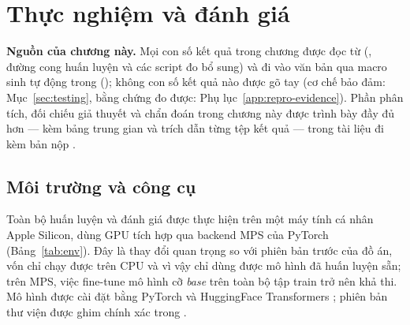 \bigskip
\section{Thực nghiệm và đánh giá}
\label{sec:experiments}

\begin{keybox}
\textbf{Nguồn của chương này.} Mọi con số kết quả trong chương được đọc từ
 (, đường cong huấn luyện và các script đo bổ sung)
và đi vào văn bản qua macro sinh tự động trong 
(); không con số kết quả nào được gõ tay (cơ chế bảo đảm:
Mục~\ref{sec:testing}, bằng chứng đo được:
Phụ lục~\ref{app:repro-evidence}). Phần phân tích, đối chiếu giả thuyết và chẩn đoán trong chương
này được trình bày đầy đủ hơn --- kèm bảng trung gian và trích dẫn từng tệp kết quả --- trong tài
liệu đi kèm bản nộp .
\end{keybox}

\subsection{Môi trường và công cụ}
\label{sec:env}

Toàn bộ huấn luyện và đánh giá được thực hiện trên một máy tính cá nhân Apple Silicon, dùng
GPU tích hợp qua backend MPS của PyTorch (Bảng~\ref{tab:env}). Đây là thay đổi quan trọng so
với phiên bản trước của đồ án, vốn chỉ chạy được trên CPU và vì vậy chỉ dùng được mô hình
đã huấn luyện sẵn; trên MPS, việc fine-tune mô hình cỡ \emph{base} trên toàn bộ tập train
trở nên khả thi. Mô hình được cài đặt bằng PyTorch \cite{paszke2019pytorch} và HuggingFace
Transformers \cite{wolf2020transformers}; phiên bản thư viện được ghim chính xác trong
.

